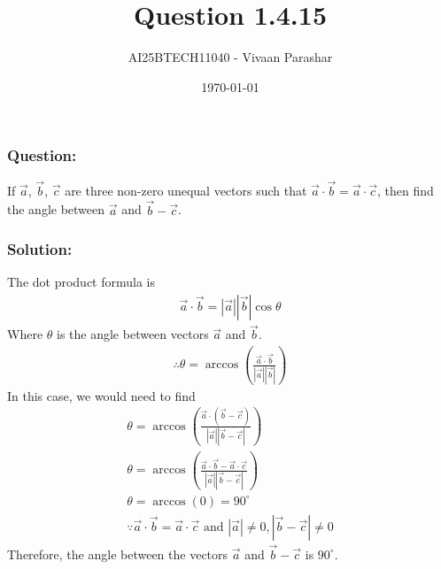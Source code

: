\documentclass{beamer}
\title{Question 1.4.15}
\author{AI25BTECH11040 - Vivaan Parashar}
\date{\today}
\begin{document}
\frame{\titlepage}

\begin{frame}
    \frametitle{Question: }
    If $\vec{a}$, $\vec{b}$, $\vec{c}$ are three non-zero unequal vectors such that $\vec{a}\cdot\vec{b} = \vec{a}\cdot\vec{c}$, then find the angle between $\vec{a}$ and $\vec{b}-\vec{c}$.
\end{frame}

\begin{frame}
    \frametitle{Solution: }
    The dot product formula is
    \begin{align}
        \vec{a}\cdot\vec{b} = |\vec{a}||\vec{b}|\cos\theta
    \end{align} Where $\theta$ is the angle between vectors $\vec{a}$ and $\vec{b}$.
    \begin{align}
        \therefore\theta = \arccos(\frac{\vec{a}\cdot\vec{b}}{|\vec{a}||\vec{b}|})
    \end{align}
    In this case, we would need to find
    \begin{align}
        \theta = \arccos(\frac{\vec{a}\cdot(\vec{b}-\vec{c})}{|\vec{a}||\vec{b}-\vec{c}|})           \\
        \theta = \arccos(\frac{\vec{a}\cdot\vec{b}-\vec{a}\cdot\vec{c}}{|\vec{a}||\vec{b}-\vec{c}|}) \\
        \theta = \arccos(0) = 90^\circ                                                               \\
        \because \vec{a}\cdot\vec{b}=\vec{a}\cdot\vec{c} \text{ and } |\vec{a}| \ne 0, |\vec{b}-\vec{c}| \ne 0
    \end{align}
    Therefore, the angle between the vectors $\vec{a}$ and $\vec{b}-\vec{c}$ is $90^\circ$.
\end{frame}
\end{document}
